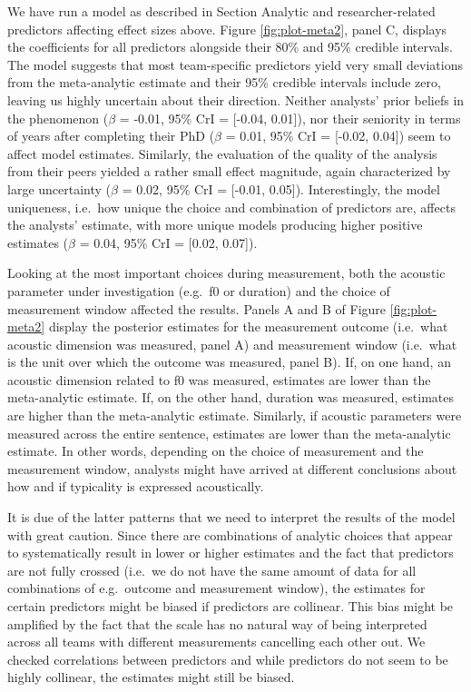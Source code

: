 \documentclass[Review,times,sageh]{sagej}
\begin{document}
We have run a model as described in Section Analytic and researcher-related predictors affecting effect sizes above.
Figure \ref{fig:plot-meta2}, panel C, displays the coefficients for all predictors alongside their 80\% and 95\% credible intervals.
The model suggests that most team-specific predictors yield very small deviations from the meta-analytic estimate and their 95\% credible intervals include zero, leaving us highly uncertain about their direction.
Neither analysts' prior beliefs in the phenomenon (\(\beta\) = -0.01, 95\% CrI = {[}-0.04, 0.01{]}), nor their seniority in terms of years after completing their PhD (\(\beta\) = 0.01, 95\% CrI = {[}-0.02, 0.04{]}) seem to affect model estimates.
Similarly, the evaluation of the quality of the analysis from their peers yielded a rather small effect magnitude, again characterized by large uncertainty (\(\beta\) = 0.02, 95\% CrI = {[}-0.01, 0.05{]}).
Interestingly, the model uniqueness, i.e.~how unique the choice and combination of predictors are, affects the analysts' estimate, with more unique models producing higher positive estimates (\(\beta\) = 0.04, 95\% CrI = {[}0.02, 0.07{]}).

Looking at the most important choices during measurement, both the acoustic parameter under investigation (e.g.~f0 or duration) and the choice of measurement window affected the results.
Panels A and B of Figure \ref{fig:plot-meta2} display the posterior estimates for the measurement outcome (i.e.~what acoustic dimension was measured, panel A) and measurement window (i.e.~what is the unit over which the outcome was measured, panel B).
If, on one hand, an acoustic dimension related to f0 was measured, estimates are lower than the meta-analytic estimate.
If, on the other hand, duration was measured, estimates are higher than the meta-analytic estimate.
Similarly, if acoustic parameters were measured across the entire sentence, estimates are lower than the meta-analytic estimate.
In other words, depending on the choice of measurement and the measurement window, analysts might have arrived at different conclusions about how and if typicality is expressed acoustically.

It is due of the latter patterns that we need to interpret the results of the model with great caution.
Since there are combinations of analytic choices that appear to systematically result in lower or higher estimates and the fact that predictors are not fully crossed (i.e.~we do not have the same amount of data for all combinations of e.g.~outcome and measurement window), the estimates for certain predictors might be biased if predictors are collinear.
This bias might be amplified by the fact that the scale has no natural way of being interpreted across all teams with different measurements cancelling each other out.
We checked correlations between predictors and while predictors do not seem to be highly collinear, the estimates might still be biased.
\end{document}
